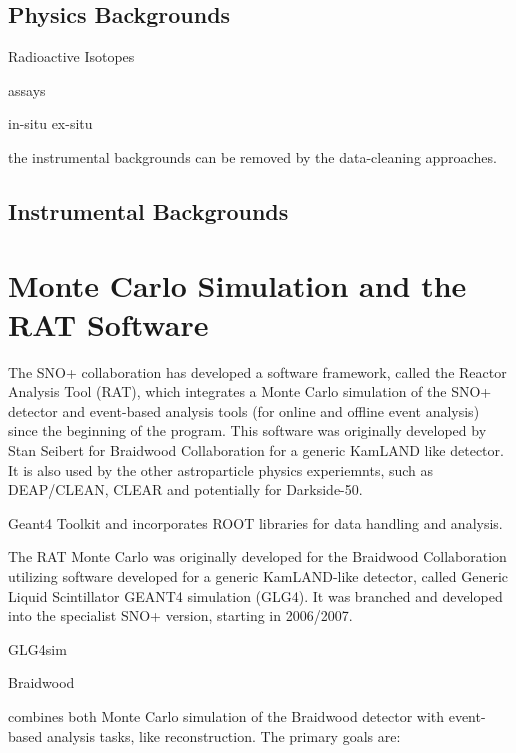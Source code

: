 \subsection{Physics Backgrounds}

Radioactive Isotopes

assays


in-situ
ex-situ



the instrumental backgrounds can be removed by the data-cleaning approaches.



\subsection{Instrumental Backgrounds}




\section{Monte Carlo Simulation and the RAT Software}
The SNO+ collaboration has developed a software framework, called the Reactor Analysis
Tool (RAT), which integrates a Monte Carlo simulation of the SNO+ detector and event-based analysis tools (for online and offline event analysis) since the beginning of the program. This software was originally developed by Stan Seibert for Braidwood Collaboration for a generic KamLAND like detector. It is also used by the other astroparticle physics experiemnts, such as DEAP/CLEAN, CLEAR and potentially for Darkside-50\cite{rat}.

Geant4 Toolkit and
incorporates ROOT libraries for data handling and analysis.

The RAT Monte Carlo was originally developed for the Braidwood Collaboration
utilizing software developed for a generic KamLAND-like detector, called Generic Liquid Scintillator GEANT4 simulation (GLG4). It was branched and
developed into the specialist SNO+ version, starting in 2006/2007.

GLG4sim


Braidwood

combines both Monte Carlo simulation of the Braidwood detector with event-based analysis tasks, like reconstruction. The primary goals are:


